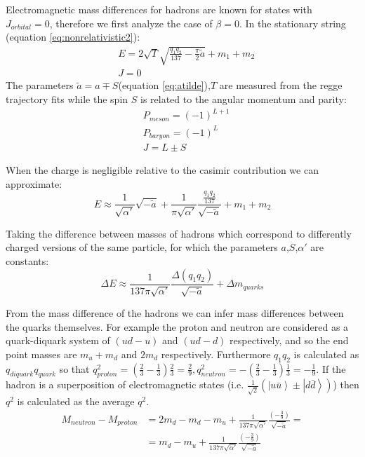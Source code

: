 \documentclass[11pt,a4paper]{article}
\begin{document}
Electromagnetic mass differences for hadrons are known for states with $J_{orbital}=0$, therefore we first analyze the case of $\beta=0$. In the stationary string (equation \ref{eq:nonrelativistic2}):
\begin{align}
&E=2\sqrt{T}\sqrt{\frac{q_1q_2}{137}-\frac{\pi}{2}\tilde{a}}+m_{1}+m_{2} \\
&J=0
\end{align}
The parameters $\tilde{a}=a\mp S$(equation \ref{eq:atilde}),$T$ are measured from the regge trajectory fits while the spin $S$ is related to the angular momentum and parity:
\begin{align*}
&P_{meson}=\left(-1\right)^{L+1}\\
&P_{baryon}=\left(-1\right)^{L}\\
&J=L\pm S
\end{align*}
 
When the charge is negligible relative to the casimir contribution we can approximate:
\begin{equation*}
E\approx\frac{1}{\sqrt{\alpha'}}\sqrt{-\tilde{a}}+\frac{1}{\pi\sqrt{\alpha'}}\frac{\frac{q_1q_2}{137}}{\sqrt{-\tilde{a}}}+m_1+m_2
\end{equation*}

Taking the difference between masses of hadrons which correspond to differently charged versions of the same particle, for which the parameters $a$,$S$,$\alpha'$ are constants:
\begin{equation*}
\Delta E\approx\frac{1}{137\pi\sqrt{\alpha'}}\frac{\Delta (q_1q_2)}{\sqrt{-\tilde{a}}}+\Delta m_{quarks}
\end{equation*}
 
From the mass difference of the hadrons we can infer mass differences between the quarks themselves. For example the proton and neutron are considered as a quark-diquark system of $\left(ud-u\right)$ and $\left(ud-d\right)$ respectively, and so the end point masses are $m_{u}+m_{d}$ and $2m_{d}$ respectively. Furthermore $q_1q_2$ is calculated as $q_{diquark}q_{quark}$ so that $q_{proton}^{2}=\left(\frac{2}{3}-\frac{1}{3}\right)\frac{2}{3}=\frac{2}{9}
, q_{neutron}^{2}=-\left(\frac{2}{3}-\frac{1}{3}\right)\frac{1}{3}=-\frac{1}{9}$. If the hadron is a superposition of electromagnetic states (i.e. $\frac{1}{\sqrt{2}}\left(\left|u\bar{u}\right\rangle \pm\left|d\bar{d}\right\rangle \right)$) then $q^{2}$ is calculated as the average $q^{2}$.
\begin{align*}
M_{neutron}-M_{proton}&=2m_{d}-m_{d}-m_{u}+\frac{1}{137\pi\sqrt{\alpha'}}\frac{\left(-\frac{3}{9}\right)}{\sqrt{-\tilde{a}}}=\\
&=m_{d}-m_{u}+\frac{1}{137\pi\sqrt{\alpha'}}\frac{\left(-\frac{3}{9}\right)}{\sqrt{-\tilde{a}}}
\end{align*}
\end{document}
